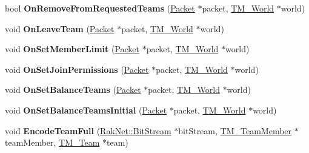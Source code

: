 \begin{DoxyCompactItemize}
\item 
\hypertarget{class_rak_net_1_1_team_manager_adc739d5879e1eb24cb79664ade5b8146}{bool {\bfseries On\-Remove\-From\-Requested\-Teams} (\hyperlink{struct_rak_net_1_1_packet}{Packet} $\ast$packet, \hyperlink{class_rak_net_1_1_t_m___world}{T\-M\-\_\-\-World} $\ast$world)}\label{class_rak_net_1_1_team_manager_adc739d5879e1eb24cb79664ade5b8146}

\item 
\hypertarget{class_rak_net_1_1_team_manager_ad96d4e957b90c5c9406f5d799bc1690d}{void {\bfseries On\-Leave\-Team} (\hyperlink{struct_rak_net_1_1_packet}{Packet} $\ast$packet, \hyperlink{class_rak_net_1_1_t_m___world}{T\-M\-\_\-\-World} $\ast$world)}\label{class_rak_net_1_1_team_manager_ad96d4e957b90c5c9406f5d799bc1690d}

\item 
\hypertarget{class_rak_net_1_1_team_manager_ac4003cf3feecf99746dc5b669116d2a2}{void {\bfseries On\-Set\-Member\-Limit} (\hyperlink{struct_rak_net_1_1_packet}{Packet} $\ast$packet, \hyperlink{class_rak_net_1_1_t_m___world}{T\-M\-\_\-\-World} $\ast$world)}\label{class_rak_net_1_1_team_manager_ac4003cf3feecf99746dc5b669116d2a2}

\item 
\hypertarget{class_rak_net_1_1_team_manager_aaf393748f2450148c492e295308aaebc}{void {\bfseries On\-Set\-Join\-Permissions} (\hyperlink{struct_rak_net_1_1_packet}{Packet} $\ast$packet, \hyperlink{class_rak_net_1_1_t_m___world}{T\-M\-\_\-\-World} $\ast$world)}\label{class_rak_net_1_1_team_manager_aaf393748f2450148c492e295308aaebc}

\item 
\hypertarget{class_rak_net_1_1_team_manager_a73a283edbb450591ab6e7e36f02c7b76}{void {\bfseries On\-Set\-Balance\-Teams} (\hyperlink{struct_rak_net_1_1_packet}{Packet} $\ast$packet, \hyperlink{class_rak_net_1_1_t_m___world}{T\-M\-\_\-\-World} $\ast$world)}\label{class_rak_net_1_1_team_manager_a73a283edbb450591ab6e7e36f02c7b76}

\item 
\hypertarget{class_rak_net_1_1_team_manager_a59d3b0827986352eb8731d2b2bf9d45d}{void {\bfseries On\-Set\-Balance\-Teams\-Initial} (\hyperlink{struct_rak_net_1_1_packet}{Packet} $\ast$packet, \hyperlink{class_rak_net_1_1_t_m___world}{T\-M\-\_\-\-World} $\ast$world)}\label{class_rak_net_1_1_team_manager_a59d3b0827986352eb8731d2b2bf9d45d}

\item 
\hypertarget{class_rak_net_1_1_team_manager_a9032e63731b6ab90795e6675bbd220d4}{void {\bfseries Encode\-Team\-Full} (\hyperlink{class_rak_net_1_1_bit_stream}{Rak\-Net\-::\-Bit\-Stream} $\ast$bit\-Stream, \hyperlink{class_rak_net_1_1_t_m___team_member}{T\-M\-\_\-\-Team\-Member} $\ast$team\-Member, \hyperlink{class_rak_net_1_1_t_m___team}{T\-M\-\_\-\-Team} $\ast$team)}\label{class_rak_net_1_1_team_manager_a9032e63731b6ab90795e6675bbd220d4}


\end{DoxyCompactItemize}
